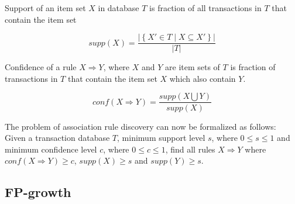 Support of an item set $X$ in database $T$ is fraction of all transactions in $T$ that contain the item set 

\[ supp(X) = \dfrac{ \vert \left\{ X' \in T  \mid X \subseteq X'  \right\}  \vert }{ \vert T \vert  } \]

Confidence of a rule $X \Rightarrow Y$, where $X$ and $Y$ are item sets of $T$ is fraction of transactions in $T$ that contain the item set $X$ which also contain $Y$.

\[conf( X \Rightarrow Y) = \dfrac{ supp( X \bigcup Y ) }{ supp(X) } \]

The problem of association rule discovery can now be formalized as follows: Given a transaction database $T$, minimum support level $s$, where $ 0 \leq s \leq 1 $ and minimum confidence level $c$, where $ 0 \leq c \leq 1 $, find all rules $X \Rightarrow Y$ where $conf( X \Rightarrow Y ) \geq c$, $supp(X) \geq s$ and $supp(Y) \geq s$. 



\subsection{FP-growth}